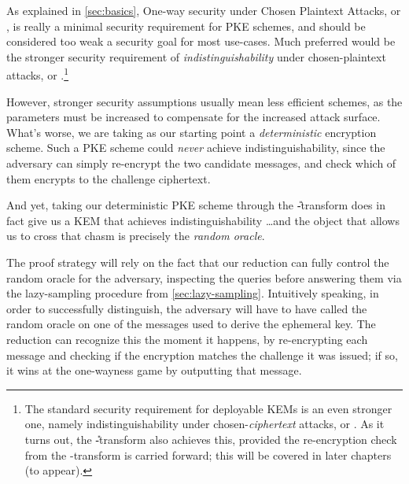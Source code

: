 
  As explained in \cref{sec:basics}, One-way security under Chosen
    Plaintext Attacks, or \owcpa, is really a minimal security
    requirement for PKE schemes, and should be considered too weak a security
    goal for most use-cases. 
    Much preferred would be the stronger security requirement of
    \emph{indistinguishability} under chosen-plaintext attacks, or
    \indcpa.\footnote{
      The standard security requirement for deployable KEMs is an even stronger one,
      namely indistinguishability under chosen-\emph{ciphertext} attacks, or
      \indcca. 
      As it turns out, the \U-transform also achieves this, provided the
      re-encryption check from the \T-transform is carried forward; this will
      be covered in later chapters (to appear).
    } 

  However, stronger security assumptions usually mean less efficient
    schemes, as the parameters must be increased to compensate for the
    increased attack surface. What's worse, we are taking as our starting
    point a \emph{deterministic} encryption scheme. Such a PKE scheme could
    \emph{never} achieve indistinguishability, since the adversary can simply
    re-encrypt the two candidate messages, and check which of them
    encrypts to the challenge ciphertext.

  And yet, taking our deterministic PKE scheme through the \U-transform
    does in fact give us a KEM that achieves indistinguishability
    \ldots and the object that allows us to cross that chasm
    is precisely the \emph{random oracle}.

  The proof strategy will rely on the fact that our reduction can
    fully control the random oracle for the adversary, inspecting the queries
    before answering them via the lazy-sampling procedure from \cref{sec:lazy-sampling}. 
    Intuitively speaking, in order to successfully distinguish, the adversary
    will have to have called the random oracle on one of
    the messages used to derive the ephemeral key. 
    The reduction can recognize this the moment it happens, by re-encrypting
    each message and checking if the encryption matches the challenge it was
    issued; if so, it wins at the one-wayness game by outputting that message.

